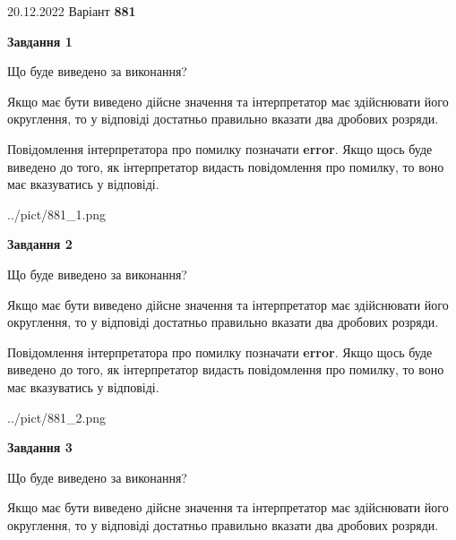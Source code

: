 \documentclass[12pt, ukrainian]{article}
\begin{document}
{20.12.2022 Варіант \No \textbf { 881 }\par}
{
\begin {Large}

{\begin {center}\textbf{Завдання 1}\end {center}}\par
Що буде виведено за виконання? \par

Якщо має бути виведено дійсне значення та інтерпретатор має здійснювати його округлення, 
то у відповіді достатньо правильно вказати два дробових розряди.

Повідомлення інтерпретатора про помилку позначати \textbf{error}.
Якщо щось буде виведено до того, як інтерпретатор видасть повідомлення про помилку, 
то воно має вказуватись у відповіді. \par

\begin{center}
	{../pict/881_1.png}
\end{center}
\newpage

{\begin {center}\textbf{Завдання 2}\end {center}}\par
Що буде виведено за виконання? \par

Якщо має бути виведено дійсне значення та інтерпретатор має здійснювати його округлення, 
то у відповіді достатньо правильно вказати два дробових розряди.

Повідомлення інтерпретатора про помилку позначати \textbf{error}.
Якщо щось буде виведено до того, як інтерпретатор видасть повідомлення про помилку, 
то воно має вказуватись у відповіді. \par

\begin{center}
	{../pict/881_2.png}
\end{center}
\newpage

{\begin {center}\textbf{Завдання 3}\end {center}}\par
Що буде виведено за виконання? \par

Якщо має бути виведено дійсне значення та інтерпретатор має здійснювати його округлення, 
то у відповіді достатньо правильно вказати два дробових розряди.


\end{Large}}
\end{document}
